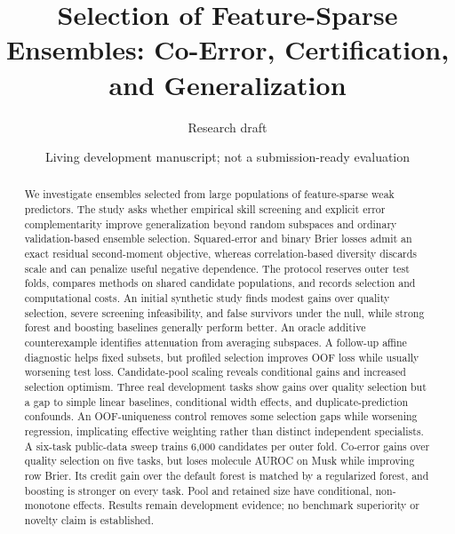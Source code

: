 \documentclass[10pt]{article}
\title{Selection of Feature-Sparse Ensembles: Co-Error, Certification, and Generalization}
\author{Research draft}
\date{Living development manuscript; not a submission-ready evaluation}
\begin{document}
\maketitle
\begin{abstract}
We investigate ensembles selected from large populations of feature-sparse weak
predictors. The study asks whether empirical skill screening and explicit error
complementarity improve generalization beyond random subspaces and ordinary
validation-based ensemble selection. Squared-error and binary Brier losses admit
an exact residual second-moment objective, whereas correlation-based diversity
discards scale and can penalize useful negative dependence. The protocol reserves
outer test folds, compares methods on shared candidate populations, and records
selection and computational costs. An initial synthetic study finds modest gains
over quality selection, severe screening infeasibility, and false survivors under
the null, while strong forest and boosting baselines generally perform better.
An oracle additive counterexample identifies attenuation from averaging subspaces.
A follow-up affine diagnostic helps fixed subsets, but profiled selection improves
OOF loss while usually worsening test loss. Candidate-pool scaling reveals
conditional gains and increased selection optimism.
Three real development tasks show gains over quality selection but a gap to
simple linear baselines, conditional width effects, and duplicate-prediction confounds.
An OOF-uniqueness control removes some selection gaps while worsening regression,
implicating effective weighting rather than distinct independent specialists.
A six-task public-data sweep trains 6,000 candidates per outer fold. Co-error gains
over quality selection on five tasks, but loses molecule AUROC on Musk while
improving row Brier. Its credit gain over the default forest is matched by a
regularized forest, and boosting is stronger on every task. Pool and retained
size have conditional, non-monotone effects.
Results remain development evidence; no benchmark superiority or novelty claim is established.
\end{abstract}






\clearpage
\begingroup\small


\endgroup
\end{document}
